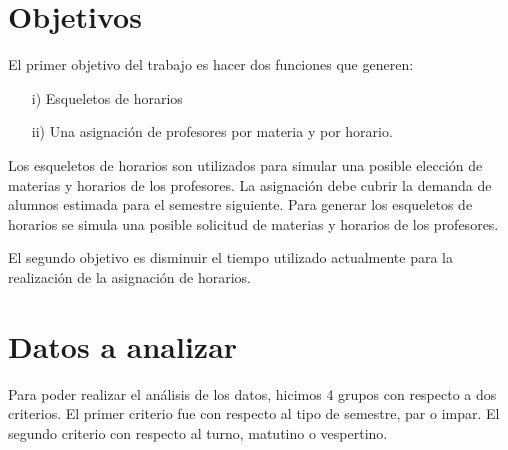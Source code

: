 \begin{table}[H]
\centering
{}
\caption[\textit{Ejemplo de asignación}]{\textit{Se muestra un ejemplo de una asignación. La matriz tiene 3 columnas (Materia, Profesor, Horario).}}\label{EjAsig}
\end{table}




\section{Objetivos}

El primer objetivo del trabajo es hacer dos funciones que generen:
  
  \begin{enumerate}
\item[i)] Esqueletos de horarios

\item[ii)] Una asignación de profesores por materia y por horario.
\end{enumerate}


Los esqueletos de horarios son utilizados para simular una posible elección de materias y horarios de los profesores. La asignación debe cubrir la demanda de alumnos estimada para el semestre siguiente. Para generar los esqueletos de horarios se simula una posible solicitud de materias y horarios de los profesores.

El segundo objetivo es disminuir el tiempo utilizado actualmente para la realización de la asignación de horarios.


\section{Datos a analizar} \label{DatosAnalizar}

Para poder realizar el análisis de los datos, hicimos 4 grupos con respecto a dos criterios. El primer criterio fue con respecto al tipo de semestre, par o impar. El segundo criterio con respecto al turno, matutino o vespertino.

